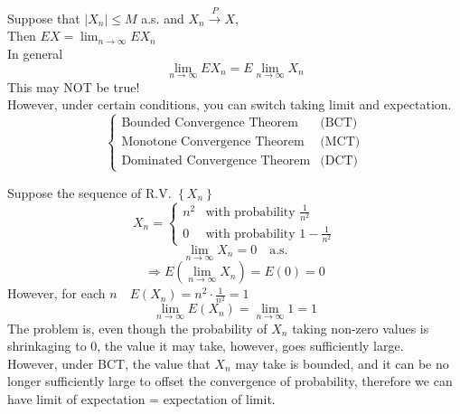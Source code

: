 

\begin{reqnoproof}
\begin{theorem}
    Suppose that $|X_n| \leq M$ a.s. and $X_n\overset{P}{\to} X$,
    \\Then $EX = \lim_{n\to \infty}EX_n$
    \\In general
    \[\lim_{n\to\infty}EX_n = E\lim_{n\to\infty}X_n\]
    This may NOT be true!
    \\However, under certain conditions, you can switch taking limit and expectation.
    \[\begin{cases}
        \text{Bounded Convergence Theorem} &\text{(BCT)} \\
        \text{Monotone Convergence Theorem} &\text{(MCT)} \\
        \text{Dominated Convergence Theorem} &\text{(DCT)}
    \end{cases}\]
\end{theorem}
\end{reqnoproof}

\begin{example}
    Suppose the sequence of R.V. $\left\{X_n \right\}$
    \[X_n = \begin{cases}
        n^2 & \text{with probability } \frac{1}{n^2} \\
        0 & \text{with probability } 1-\frac{1}{n^2}
    \end{cases}\]
    \[\lim_{n\to\infty}X_n = 0 \quad \text{a.s.}\]
    \[\Rightarrow E\left(\lim_{n\to\infty}X_n\right) = E(0) = 0\]
    However, for each $n \quad E(X_n) = n^2 \cdot \frac{1}{n^2} = 1$
    \[\lim_{n\to\infty}E(X_n) = \lim_{n\to\infty}1 = 1\]
    The problem is, even though the probability of $X_n$ taking non-zero values is shrinkaging to 0, the value it may take, however, goes sufficiently large.
    \\However, under BCT, the value that $X_n$ may take is bounded, and it can be no longer sufficiently large to offset the convergence of probability, therefore we can have limit of expectation = expectation of limit.
\end{example}

